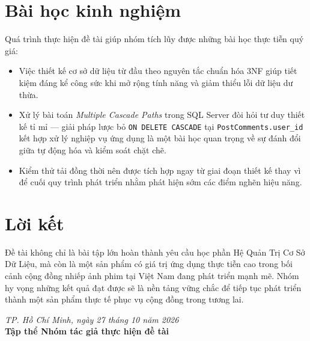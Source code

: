 \section*{Bài học kinh nghiệm}

Quá trình thực hiện đề tài giúp nhóm tích lũy được những bài học thực tiễn quý giá:

\begin{itemize}[leftmargin=2em]
    \item Việc thiết kế cơ sở dữ liệu từ đầu theo nguyên tắc chuẩn hóa 3NF giúp tiết kiệm đáng kể công sức khi mở rộng tính năng và giảm thiểu lỗi dữ liệu dư thừa.
    \item Xử lý bài toán \textit{Multiple Cascade Paths} trong SQL Server đòi hỏi tư duy thiết kế tỉ mỉ — giải pháp lược bỏ \texttt{ON DELETE CASCADE} tại \texttt{PostComments.user\_id} kết hợp xử lý nghiệp vụ ứng dụng là một bài học quan trọng về sự đánh đổi giữa tự động hóa và kiểm soát chặt chẽ.
    \item Kiểm thử tải đồng thời nên được tích hợp ngay từ giai đoạn thiết kế thay vì để cuối quy trình phát triển nhằm phát hiện sớm các điểm nghẽn hiệu năng.
\end{itemize}

\section*{Lời kết}

Đề tài không chỉ là bài tập lớn hoàn thành yêu cầu học phần Hệ Quản Trị Cơ Sở Dữ Liệu, mà còn là một sản phẩm có giá trị ứng dụng thực tiễn cao trong bối cảnh cộng đồng nhiếp ảnh phim tại Việt Nam đang phát triển mạnh mẽ. Nhóm hy vọng những kết quả đạt được sẽ là nền tảng vững chắc để tiếp tục phát triển thành một sản phẩm thực tế phục vụ cộng đồng trong tương lai.

\vspace{1cm}
\begin{flushright}
    \textit{TP. Hồ Chí Minh, ngày 27 tháng 10 năm 2026}\\[0.4cm]
    \textbf{Tập thể Nhóm tác giả thực hiện đề tài}
\end{flushright}
